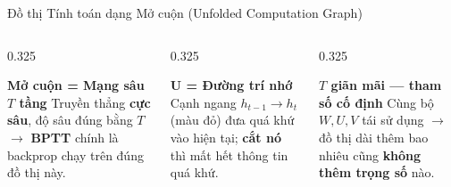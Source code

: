 \documentclass[aspectratio=169, 10pt]{beamer}
\begin{document}
\begin{frame}{Đồ thị Tính toán dạng Mở cuộn (Unfolded Computation Graph)}
\vspace{0.2cm}
\begin{columns}[T]
\begin{column}{0.325\textwidth}
\begin{block}{\textbf{Mở cuộn = Mạng sâu \(T\) tầng}}
{\small Truyền thẳng \textbf{cực sâu}, độ sâu đúng bằng \(T\) \(\rightarrow\) \textbf{BPTT} chính là backprop chạy trên đúng đồ thị này.}
\end{block}
\end{column}
\begin{column}{0.325\textwidth}
\begin{alertblock}{\textbf{\(\mathbf{U}\) = Đường trí nhớ}}
{\small Cạnh ngang \(h_{t-1} \rightarrow h_t\) (màu đỏ) đưa quá khứ vào hiện tại; \textbf{cắt nó} thì mất hết thông tin quá khứ.}
\end{alertblock}
\end{column}
\begin{column}{0.325\textwidth}
\begin{exampleblock}{\textbf{\(T\) giãn mãi — tham số cố định}}
{\small Cùng bộ \(W, U, V\) tái sử dụng \(\rightarrow\) đồ thị dài thêm bao nhiêu cũng \textbf{không thêm trọng số} nào.}
\end{exampleblock}
\end{column}
\end{columns}
\end{frame}
\end{document}
